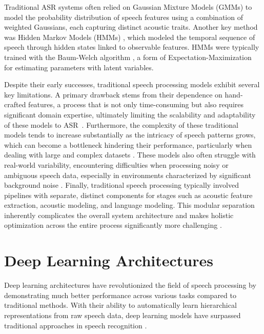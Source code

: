 Traditional ASR systems often relied on Gaussian Mixture Models (GMMs) \cite{inbook_gmm} to model the probability distribution of speech features using a combination of weighted Gaussians, each capturing distinct acoustic traits. Another key method was Hidden Markov Models (HMMs) \cite{8187420}, which modeled the temporal sequence of speech through hidden states linked to observable features. HMMs were typically trained with the Baum-Welch algorithm \cite{Yang_2015}, a form of Expectation-Maximization for estimating parameters with latent variables.



Despite their early successes, traditional speech processing models exhibit several key limitations. A primary drawback stems from their dependence on hand-crafted features, a process that is not only time-consuming but also requires significant domain expertise, ultimately limiting the scalability and adaptability of these models to ASR~\cite{6296526, yu2014automatic}. Furthermore, the complexity of these traditional models tends to increase substantially as the intricacy of speech patterns grows, which can become a bottleneck hindering their performance, particularly when dealing with large and complex datasets \cite{ghai2012literature, yu2014automatic}. These models also often struggle with real-world variability, encountering difficulties when processing noisy or ambiguous speech data, especially in environments characterized by significant background noise \cite{7292420}. Finally, traditional speech processing typically involved pipelines with separate, distinct components for stages such as acoustic feature extraction, acoustic modeling, and language modeling. This modular separation inherently complicates the overall system architecture and makes holistic optimization across the entire process significantly more challenging \cite{Mehrish_2023}.


\section{Deep Learning Architectures}

Deep learning architectures have revolutionized the field of speech processing by demonstrating much better performance across various tasks compared to traditional methods. With their ability to automatically learn hierarchical representations from raw speech data, deep learning models have surpassed traditional approaches in speech recognition \cite{Mehrish_2023, Prabhavalkar_2024, Basak2022}. 

